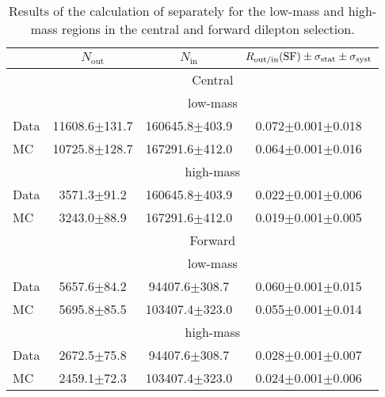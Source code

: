 
\begin{table}[hbtp]
 \renewcommand{\arraystretch}{1.3}
 \setlength{\belowcaptionskip}{6pt}
 \centering
 \caption{Results of the calculation of \Routin separately for the low-mass and high-mass regions in the central and forward dilepton selection.}
  \label{tab:rOutIn}
\begin{tabular}{l|c|c|c}     
 & $N_{\text{out}}$ & $N_{\text{in}}$ & $ R_\text{out/in} (\text{SF}) \pm \sigma_{\text{stat}} \pm \sigma_{\text{syst}}$  \\    
\hline
 & \multicolumn{3}{c}{Central} \\
\hline 
 & \multicolumn{3}{c}{low-mass}   \\ 
  Data & 11608.6$\pm$131.7 & 160645.8$\pm$403.9 & 0.072$\pm$0.001$\pm$0.018 \\
 MC & 10725.8$\pm$128.7 & 167291.6$\pm$412.0 & 0.064$\pm$0.001$\pm$0.016 \\

\hline 
& \multicolumn{3}{c}{high-mass} \\ 
\hline
 Data & 3571.3$\pm$91.2 & 160645.8$\pm$403.9 & 0.022$\pm$0.001$\pm$0.006 \\
 MC & 3243.0$\pm$88.9 & 167291.6$\pm$412.0 & 0.019$\pm$0.001$\pm$0.005 \\

 
    \hline 
& \multicolumn{3}{c}{Forward} \\
\hline 
 & \multicolumn{3}{c}{low-mass}   \\ 
  Data & 5657.6$\pm$84.2 & 94407.6$\pm$308.7 & 0.060$\pm$0.001$\pm$0.015 \\
 MC & 5695.8$\pm$85.5 & 103407.4$\pm$323.0 & 0.055$\pm$0.001$\pm$0.014 \\

\hline 
& \multicolumn{3}{c}{high-mass} \\ 
\hline
 Data & 2672.5$\pm$75.8 & 94407.6$\pm$308.7 & 0.028$\pm$0.001$\pm$0.007 \\
 MC & 2459.1$\pm$72.3 & 103407.4$\pm$323.0 & 0.024$\pm$0.001$\pm$0.006 \\


  
\end{tabular}  
\end{table}
